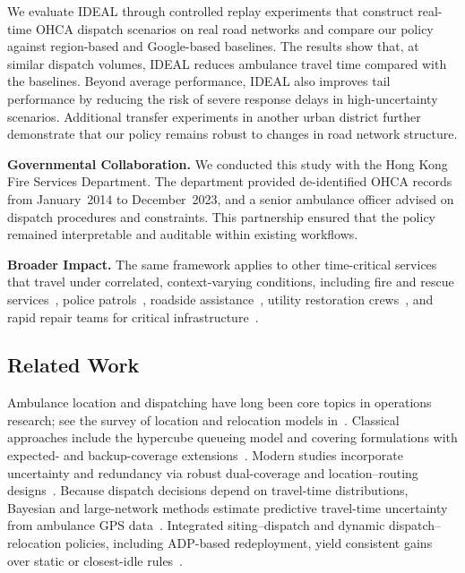 \documentclass[11pt, letterpaper, oneside, reqno]{amsart}
\begin{document}
We evaluate IDEAL through controlled replay experiments that construct real-time OHCA dispatch scenarios on real road networks and compare our policy against region-based and Google-based baselines. The results show that, at similar dispatch volumes, IDEAL reduces ambulance travel time compared with the baselines. Beyond average performance, IDEAL also improves tail performance by reducing the risk of severe response delays in high-uncertainty scenarios. Additional transfer experiments in another urban district further demonstrate that our policy remains robust to changes in road network structure.

\noindent\textbf{Governmental Collaboration.} We conducted this study with the Hong Kong Fire Services Department. The department provided de-identified OHCA records from January~2014 to December~2023, and a senior ambulance officer advised on dispatch procedures and constraints. This partnership ensured that the policy remained interpretable and auditable within existing workflows.

\noindent\textbf{Broader Impact.} The same framework applies to other time-critical services that travel under correlated, context-varying conditions, including fire and rescue services~\cite{ref:wan2022initial, ref:hassler2024socio}, police patrols~\cite{ref:deangelo2023police, ref:blanes2018effect}, roadside assistance~\cite{ref:salum2020impact}, utility restoration crews~\cite{ref:arif2018optimizing, ref:zhou2024resilience, ref:balut2019ranking, ref:liu2020survivability}, and rapid repair teams for critical infrastructure~\cite{ref:lin2024risk}.


\subsection{Related Work} \label{sec:related-work}
Ambulance location and dispatching have long been core topics in operations research; see the survey of location and relocation models in~\cite{ref:brotcorne2003ambulance}. Classical approaches include the hypercube queueing model and covering formulations with expected- and backup-coverage extensions~\cite{ref:larson1974hypercube, ref:toregas1971location, ref:church1974maximal, ref:daskin1983maximum, ref:hogan1986backup}. Modern studies incorporate uncertainty and redundancy via robust dual-coverage and location--routing designs~\cite{ref:wajid2022robust, ref:boutilier2020ambulance}. Because dispatch decisions depend on travel-time distributions, Bayesian and large-network methods estimate predictive travel-time uncertainty from ambulance GPS data~\cite{ref:westgate2013travel, ref:westgate2016large}. Integrated siting--dispatch and dynamic dispatch--relocation policies, including ADP-based redeployment, yield consistent gains over static or closest-idle rules~\cite{ref:yoon2021stochastic, ref:gendreau2001dynamic, ref:nasrollahzadeh2018real, ref:maxwell2010approximate}.
\end{document}
